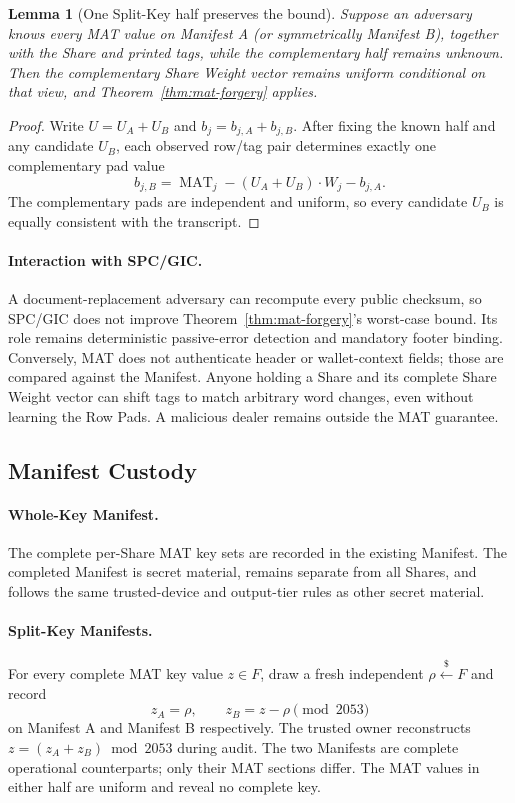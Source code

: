 \documentclass[11pt]{article}
\newtheorem{lemma}[theorem]{Lemma}
\begin{document}
\begin{lemma}[One Split-Key half preserves the bound]
\label{lem:mat-split}
Suppose an adversary knows every MAT value on Manifest A (or symmetrically Manifest B), together with the Share and printed tags, while the complementary half remains unknown. Then the complementary Share Weight vector remains uniform conditional on that view, and Theorem~\ref{thm:mat-forgery} applies.
\end{lemma}

\begin{proof}
Write $U=U_A+U_B$ and $b_j=b_{j,A}+b_{j,B}$. After fixing the known half and any candidate $U_B$, each observed row/tag pair determines exactly one complementary pad value
\[
    b_{j,B}=\operatorname{MAT}_j-(U_A+U_B)\cdot W_j-b_{j,A}.
\]
The complementary pads are independent and uniform, so every candidate $U_B$ is equally consistent with the transcript.
\end{proof}

\paragraph{Interaction with SPC/GIC.} A document-replacement adversary can recompute every public checksum, so SPC/GIC does not improve Theorem~\ref{thm:mat-forgery}'s worst-case bound. Its role remains deterministic passive-error detection and mandatory footer binding. Conversely, MAT does not authenticate header or wallet-context fields; those are compared against the Manifest. Anyone holding a Share and its complete Share Weight vector can shift tags to match arbitrary word changes, even without learning the Row Pads. A malicious dealer remains outside the MAT guarantee.

\subsection{Manifest Custody}

\paragraph{Whole-Key Manifest.} The complete per-Share MAT key sets are recorded in the existing Manifest. The completed Manifest is secret material, remains separate from all Shares, and follows the same trusted-device and output-tier rules as other secret material.

\paragraph{Split-Key Manifests.} For every complete MAT key value $z\in F$, draw a fresh independent $\rho\xleftarrow{\$}F$ and record
\[
    z_A=\rho,\qquad z_B=z-\rho\pmod{2053}
\]
on Manifest A and Manifest B respectively. The trusted owner reconstructs $z=(z_A+z_B)\bmod2053$ during audit. The two Manifests are complete operational counterparts; only their MAT sections differ. The MAT values in either half are uniform and reveal no complete key.
\end{document}
